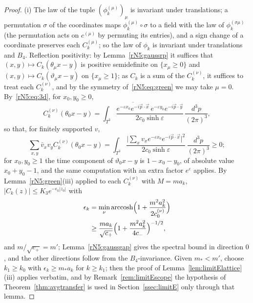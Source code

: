 \begin{proof}
(i) The law of the tuple $(\phi^{(\mu)}_k)_\mu$ is invariant under
translations; a permutation $\sigma$ of the coordinates maps $\phi^{(\mu)}_k
\circ\sigma$ to a field with the law of $\phi^{(\sigma\mu)}_k$ (the
permutation acts on $c^{(\mu)}$ by permuting its entries), and a sign change
of a coordinate preserves each $C^{(\mu)}_k$; so the law of $\phi_k$ is
invariant under translations and $B_4$. Reflection positivity: by
Lemma~\ref{rN5:gaussrp} it suffices that $(x,y)\mapsto C_k(\theta_\mu x-y)$
is positive semidefinite on $\{x_\mu\ge0\}$ and $(x,y)\mapsto C_k(\vartheta_\mu
x-y)$ on $\{x_\mu\ge1\}$; as $C_k$ is a sum of the $C^{(\nu)}_k$, it suffices
to treat each $C^{(\nu)}_k$, and by the symmetry of~\eqref{rN5:eq:green} we
may take $\mu=0$. By~\eqref{rN5:eq:3d}, for $x_0,y_0\ge0$,
\[
C^{(\nu)}_k(\theta_0x-y)=\int_{T^3}\frac{\overline{e^{-\varepsilon x_0}
e^{-i\vec p\cdot\vec x}}\,e^{-\varepsilon y_0}e^{-i\vec p\cdot\vec y}}
{2c_0\sinh\varepsilon}\,\frac{d^3p}{(2\pi)^3},
\]
so that, for finitely supported $v$,
\[
\sum_{x,y}\bar v_xv_yC^{(\nu)}_k(\theta_0x-y)=\int_{T^3}\frac{\bigl|\sum_xv_x
e^{-\varepsilon x_0}e^{-i\vec p\cdot\vec x}\bigr|^2}{2c_0\sinh\varepsilon}\,
\frac{d^3p}{(2\pi)^3}\ge0;
\]
for $x_0,y_0\ge1$ the time component of $\vartheta_0x-y$ is
$1-x_0-y_0$, of absolute value $x_0+y_0-1$, and the same computation with an
extra factor $e^{\varepsilon}$ applies. By Lemma~\ref{rN5:green}(iii) applied
to each $C^{(\nu)}_k$ with $M=ma_k$, $|C_k(z)|\le K_3e^{-\epsilon_k|z_0|}$ with
\[
\begin{split}
\epsilon_k&=\min_\nu\operatorname{arccosh}\Bigl(1+\frac{m^2a_k^2}{2c^{(\nu)}_0}
\Bigr)\\
&\ge\frac{ma_k}{\sqrt{c_+}}\Bigl(1+\frac{m^2a_k^2}{4c_-}\Bigr)^{-1/2},
\end{split}
\]
and $m/\sqrt{c_+}=m'$;
Lemma~\ref{rN5:gaussgap} gives the spectral bound in direction $0$, and the
other directions follow from the $B_4$-invariance. Given $m_*<m'$, choose $k_1
\ge k_0$ with $\epsilon_k\ge m_*a_k$ for $k\ge k_1$; then the proof of
Lemma~\ref{lem:limitElattice}(iii) applies verbatim, and by
Remark~\ref{rem:limitEscope} the hypothesis of Theorem~\ref{thm:avgtransfer}
is used in Section~\ref{ssec:limitE} only through that lemma.


\end{proof}
